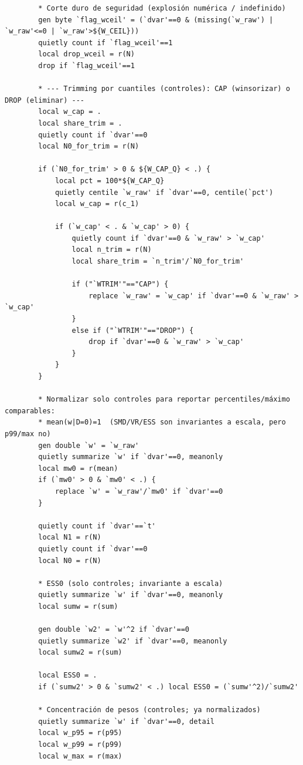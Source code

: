 \documentclass[12pt]{article}
\begin{document}
\begin{lstlisting}
        * Corte duro de seguridad (explosión numérica / indefinido)
        gen byte `flag_wceil' = (`dvar'==0 & (missing(`w_raw') | `w_raw'<=0 | `w_raw'>${W_CEIL}))
        quietly count if `flag_wceil'==1
        local drop_wceil = r(N)
        drop if `flag_wceil'==1

        * --- Trimming por cuantiles (controles): CAP (winsorizar) o DROP (eliminar) ---
        local w_cap = .
        local share_trim = .
        quietly count if `dvar'==0
        local N0_for_trim = r(N)

        if (`N0_for_trim' > 0 & ${W_CAP_Q} < .) {
            local pct = 100*${W_CAP_Q}
            quietly centile `w_raw' if `dvar'==0, centile(`pct')
            local w_cap = r(c_1)

            if (`w_cap' < . & `w_cap' > 0) {
                quietly count if `dvar'==0 & `w_raw' > `w_cap'
                local n_trim = r(N)
                local share_trim = `n_trim'/`N0_for_trim'

                if ("`WTRIM'"=="CAP") {
                    replace `w_raw' = `w_cap' if `dvar'==0 & `w_raw' > `w_cap'
                }
                else if ("`WTRIM'"=="DROP") {
                    drop if `dvar'==0 & `w_raw' > `w_cap'
                }
            }
        }

        * Normalizar solo controles para reportar percentiles/máximo comparables:
        * mean(w|D=0)=1  (SMD/VR/ESS son invariantes a escala, pero p99/max no)
        gen double `w' = `w_raw'
        quietly summarize `w' if `dvar'==0, meanonly
        local mw0 = r(mean)
        if (`mw0' > 0 & `mw0' < .) {
            replace `w' = `w_raw'/`mw0' if `dvar'==0
        }

        quietly count if `dvar'==`t'
        local N1 = r(N)
        quietly count if `dvar'==0
        local N0 = r(N)

        * ESS0 (solo controles; invariante a escala)
        quietly summarize `w' if `dvar'==0, meanonly
        local sumw = r(sum)

        gen double `w2' = `w'^2 if `dvar'==0
        quietly summarize `w2' if `dvar'==0, meanonly
        local sumw2 = r(sum)

        local ESS0 = .
        if (`sumw2' > 0 & `sumw2' < .) local ESS0 = (`sumw'^2)/`sumw2'

        * Concentración de pesos (controles; ya normalizados)
        quietly summarize `w' if `dvar'==0, detail
        local w_p95 = r(p95)
        local w_p99 = r(p99)
        local w_max = r(max)


\end{lstlisting}
\end{document}
